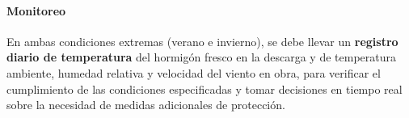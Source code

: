 \paragraph{Monitoreo}
En ambas condiciones extremas (verano e invierno), se debe llevar un \textbf{registro diario de temperatura} del hormigón fresco en la descarga y de temperatura ambiente, humedad relativa y velocidad del viento en obra, para verificar el cumplimiento de las condiciones especificadas y tomar decisiones en tiempo real sobre la necesidad de medidas adicionales de protección.